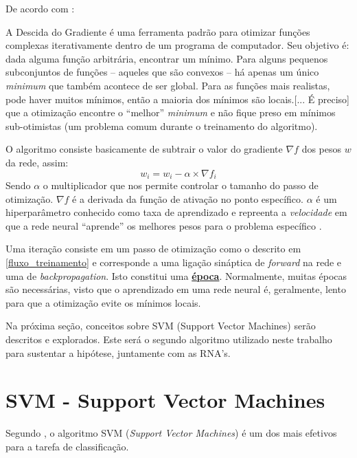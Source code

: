 De acordo com : 
\begin{citacao}
	A Descida do Gradiente é uma ferramenta padrão para otimizar funções complexas iterativamente dentro de um programa de computador. Seu objetivo é: dada alguma função arbitrária, encontrar um mínimo. Para alguns pequenos subconjuntos de funções – aqueles que são convexos – há apenas um único \textit{minimum} que também acontece de ser global. Para as funções mais realistas, pode haver muitos mínimos, então a maioria dos mínimos são locais.[... É preciso] que a otimização encontre o “melhor” \textit{minimum} e não fique preso em mínimos sub-otimistas (um problema comum durante o treinamento do algoritmo).
\end{citacao}

O algoritmo consiste basicamente de subtrair o valor do gradiente $\nabla f$ dos pesos $w$ da rede, assim:
\begin{equation}\label{gradiente}
	w_i = w_i - \alpha \times \nabla f_i
\end{equation}
Sendo $\alpha$ o multiplicador que nos permite controlar o tamanho do passo de otimização.  $\nabla f$ é a derivada da função de ativação no ponto específico. $\alpha$ é um hiperparâmetro conhecido como taxa de aprendizado e repreenta a \textit{velocidade} em que a rede neural ``aprende'' os melhores pesos para o problema específico \cite{haykin_redes_2001}.

Uma iteração consiste em um passo de otimização como o descrito em \ref{fluxo_treinamento} e corresponde a uma ligação sináptica de \textit{forward} na rede e uma de \textit{backpropagation}. Isto constitui uma \textbf{\underline{época}}. Normalmente, muitas épocas são necessárias, visto que o aprendizado em uma rede neural é, geralmente, lento para que a otimização evite os mínimos locais.

Na próxima seção, conceitos sobre SVM (Support Vector Machines) serão descritos e explorados. Este será o segundo algoritmo utilizado neste trabalho para sustentar a hipótese, juntamente com as RNA's.

\section{SVM - Support Vector Machines}\label{SVM}
Segundo , o algoritmo SVM (\textit{Support Vector Machines}) é um dos mais efetivos para a tarefa de classificação.

